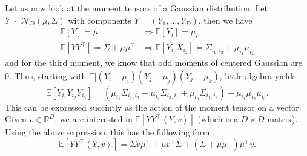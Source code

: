 \documentclass[bj,authoryear]{imsart}
\theoremstyle{plain}
\theoremstyle{remark}
\def\bbE{\mathbb{E}}
\def\bbR{\mathbb{R}}
\def\cN{\mathcal{N}}
\newcommand{\innerprod}[1]{\left\langle#1\right\rangle}
\begin{document}
\begin{appendix}
Let us now look at the moment tensors of a Gaussian distribution. Let $Y\sim \cN_D(\mu,\Sigma)$ with components $Y=(Y_1,\dots,Y_D)$, then we have
\begin{align*}
    \bbE[Y] = \mu &\Rightarrow \bbE[Y_i] = \mu_i\\
    \bbE[YY^\top] = \Sigma + \mu\mu^\top &\Rightarrow \bbE[Y_{i_1}X_{i_2}] = \Sigma_{i_1,i_2} + \mu_{i_1}\mu_{i_2}
\end{align*}
and for the third moment, we know that odd moments of centered Gaussian are 0. Thus, starting with $\bbE[(Y_i- \mu_i)(Y_j-\mu_j)(Y_j-\mu_k)$, little algebra yields
\begin{equation}
    \bbE[Y_{i_1}Y_{i_2}Y_{i_3}] = \left(\mu_{i_1}\Sigma_{i_2 , i_3} + \mu_{i_2}\Sigma_{i_3 , i_1} + \mu_{i_3}\Sigma_{i_1 , i_2}\right) + \mu_{i_1}\mu_{i_2}\mu_{i_3}.
\end{equation}
This can be expressed succintly as the action of the moment tensor on a vector. Given $v\in\bbR^D$, we are interested in $\bbE[YY^\top\innerprod{Y,v}]$ (which is a $D\times D$ matrix). Using the above expression, this has the following form
\begin{equation}
    \bbE[YY^\top\innerprod{Y,v}] = \Sigma v \mu^\top + \mu v^\top \Sigma + \left(\Sigma + \mu\mu^\top\right)\mu^\top v.
\end{equation}


\end{appendix}
\end{document}
